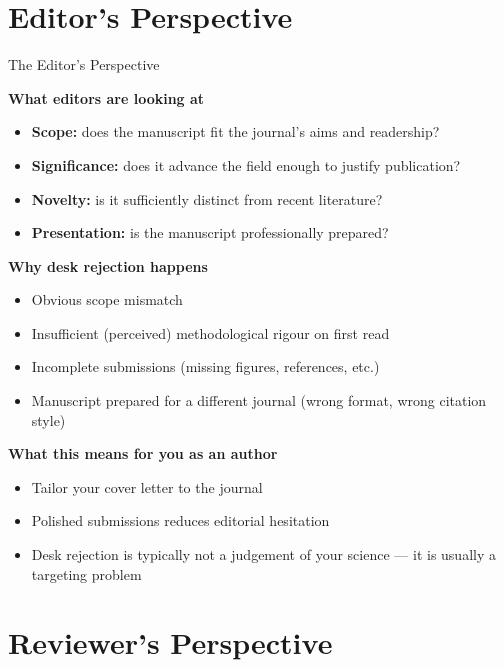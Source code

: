 \documentclass{beamer}
\begin{document}
\section{Editor's Perspective}

\begin{frame}{The Editor's Perspective}

  \footnotesize
  \textbf{What editors are looking at}
  \begin{itemize}
    \item \textbf{Scope:} does the manuscript fit the journal's
      aims and readership?
    \item \textbf{Significance:} does it advance the field enough
      to justify publication?
    \item \textbf{Novelty:} is it sufficiently distinct from
      recent literature?
    \item \textbf{Presentation:} is the manuscript professionally
      prepared?
  \end{itemize}

  \medskip
  \textbf{Why desk rejection happens}
  \begin{itemize}
    \item Obvious scope mismatch
    \item Insufficient (perceived) methodological rigour on first read
    \item Incomplete submissions (missing figures, references, etc.)
    \item Manuscript prepared for a different journal
      (wrong format, wrong citation style)
  \end{itemize}

  \medskip
  \textbf{What this means for you as an author}
  \begin{itemize}
    \item Tailor your cover letter to the journal
    \item Polished submissions reduces editorial hesitation
    \item Desk rejection is typically not a judgement of your science ---
      it is usually a targeting problem
  \end{itemize}

\end{frame}


\section{Reviewer's Perspective}
\end{document}
